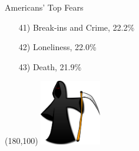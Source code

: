 \begin{frame}{Americans' Top Fears}
\begin{enumerate}
        \item[41)] Break-ins and Crime,  22.2\%
        \item[42)] Loneliness, 22.0\%
        \item[43)] Death, 21.9\%
    \end{enumerate}
    \Put(180,100){ \includegraphics[width=0.2\textwidth]{img/grim-reaper.png} }
\end{frame}


